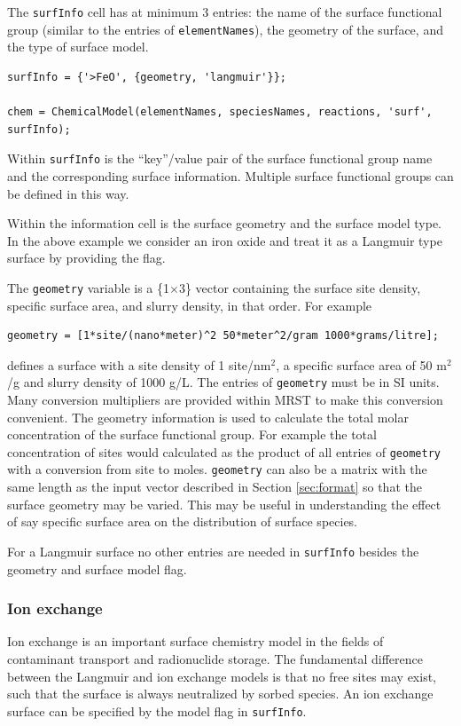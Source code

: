 \documentclass{article}
\begin{document}
The \verb|surfInfo| cell has at minimum 3 entries: the name of the surface functional group (similar to the entries of \verb|elementNames|), the geometry of the surface, and the type of surface model.

\begin{lstlisting}
surfInfo = {'>FeO', {geometry, 'langmuir'}};

chem = ChemicalModel(elementNames, speciesNames, reactions, 'surf', surfInfo);
\end{lstlisting}
Within \verb|surfInfo| is the ``key''/value pair of the surface functional group name and the corresponding surface information. Multiple surface functional groups can be defined in this way. 

Within the information cell is the surface geometry and the surface model type. In the above example we consider an iron oxide and treat it as a Langmuir type surface by providing the  flag.

The \verb|geometry| variable is a \{1$\times$3\} vector containing the surface site density, specific surface area, and slurry density, in that order. For example

\begin{lstlisting}
geometry = [1*site/(nano*meter)^2 50*meter^2/gram 1000*grams/litre];
\end{lstlisting}

defines a surface with a site density of 1 site/nm$^2$, a specific surface area of 50 m$^2$/g and slurry density of 1000 g/L.  The entries of \verb|geometry| must be in SI units. Many conversion multipliers are provided within MRST to make this conversion convenient. The geometry information is used to calculate the total molar concentration of the surface functional group. For example the total concentration of  sites would calculated as the product of all entries of \verb|geometry| with a conversion from site to moles. \verb|geometry| can also be a matrix with the same length as the input vector described in Section \ref{sec:format} so that the surface geometry may be varied. This may be useful in understanding the effect of say specific surface area on the distribution of surface species. 

For a Langmuir surface no other entries are needed in \verb|surfInfo| besides the geometry and surface model flag.

\subsubsection{Ion exchange}
Ion exchange is an important surface chemistry model in the fields of contaminant transport and radionuclide storage. The fundamental difference between the Langmuir and ion exchange models is that no free sites may exist, such that the surface is always neutralized by sorbed species. An ion exchange surface can be specified by the  model flag in \verb|surfInfo|. 
\end{document}
